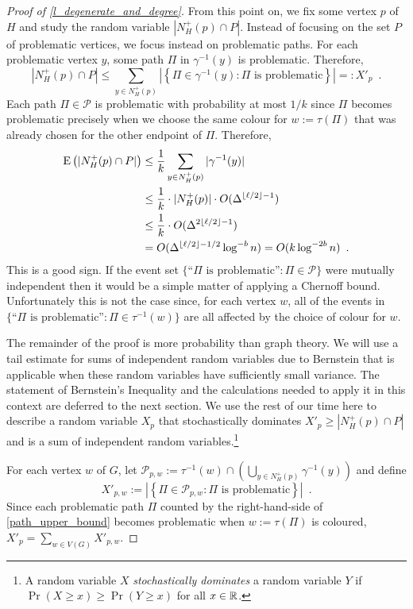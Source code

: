 \documentclass{patmorin}
\newcommand{\defin}[1]{\emph{\color{brightmaroon}#1}}
\begin{document}
\begin{proof}[Proof of \cref{l_degenerate_and_degree}]
  From this point on, we fix some vertex $p$ of $H$ and study the random variable $|N_H^+(p)\cap P|$.  Instead of focusing on the set $P$ of problematic vertices, we focus instead on problematic paths.  For each problematic vertex $y$, some path $\Pi$ in $\gamma^{-1}(y)$ is problematic. Therefore,
  \begin{equation}
    |N^+_H(p)\cap P| \le \sum_{y\in N^+_H(p)} \left|\left\{\Pi\in\gamma^{-1}(y): \text{$\Pi$ is problematic}\right\}\right| =: X'_{p} \enspace .
    \label{path_upper_bound}
  \end{equation}
  Each path $\Pi\in\mathcal{P}$ is problematic with probability at most $1/k$ since $\Pi$ becomes problematic precisely when we choose the same colour for $w:=\tau(\Pi)$ that was already chosen for the other endpoint of $\Pi$.  Therefore,
  \begin{align*}
    \mathrm{E}\left(|N^+_H(p)\cap P|\right)
    & \le \frac{1}{k}\sum_{y\in N^+_H(p)}|\gamma^{-1}(y)| \\
    & \le \frac{1}{k}\cdot|N^+_H(p)|\cdot O(\Delta^{\lfloor\ell /2\rfloor-1}) \\
    & \le \frac{1}{k}\cdot O(\Delta^{2\lfloor\ell /2\rfloor-1}) \\
    & = O(\Delta^{\lfloor\ell /2\rfloor-1/2}\log^{-b} n) = O(k\log^{-2b} n) \enspace .
  \end{align*}
  This is a good sign. If the event set $\{\text{``$\Pi$ is problematic''}:\Pi\in\mathcal{P}\}$ were mutually independent then it would be a simple matter of applying a Chernoff bound.  Unfortunately this is not the case since, for each vertex $w$, all of the events in $\{\text{``$\Pi$ is problematic''}:\Pi\in\tau^{-1}(w)\}$ are all affected by the choice of colour for $w$.

  The remainder of the proof is more probability than graph theory.  We will use a tail estimate for sums of independent random variables due to Bernstein that is applicable when these random variables have sufficiently small variance.  The statement of Bernstein's Inequality and the calculations needed to apply it in this context are deferred to the next section. We use the rest of our time here to describe a random variable $X_p$ that stochastically dominates $X'_p\ge |N^+_H(p)\cap P|$ and is a sum of independent random variables.\footnote{A random variable $X$ \defin{stochastically dominates} a random variable $Y$ if $\Pr(X\ge x) \ge \Pr(Y\ge x)$ for all $x\in\mathbb{R}$.}

  For each vertex $w$ of $G$, let $\mathcal{P}_{p,w}:=\tau^{-1}(w)\cap (\bigcup_{y\in N^+_H(p)}\gamma^{-1}(y))$ and define
  \[
    X'_{p,w} :=\left|\left\{\Pi\in\mathcal{P}_{p,w}:\text{$\Pi$ is problematic}\right\}\right|
    \enspace .
  \]
  Since each problematic path $\Pi$ counted by the right-hand-side of \cref{path_upper_bound} becomes problematic when $w:=\tau(\Pi)$ is coloured, $X'_p=\sum_{w\in V(G)} X'_{p,w}$.


\end{proof}
\end{document}

